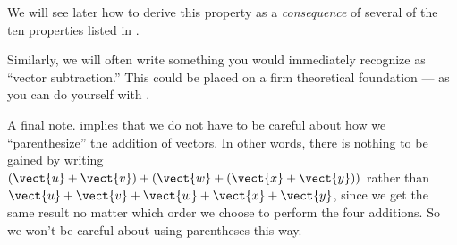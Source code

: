%
We will see later how to derive this property as a {\em consequence} of several of the ten properties listed in .\par
%
Similarly, we will often write something you would immediately recognize as ``vector subtraction.''  This could be placed on a firm theoretical foundation --- as you can do yourself with .\par
%
A final note.   implies that we do not have to be careful about how we ``parenthesize'' the addition of vectors.  In other words, there is nothing to be gained by writing
$\left(\vect{u}+\vect{v}\right)+\left(\vect{w}+\left(\vect{x}+\vect{y}\right)\right)$
rather than
$\vect{u}+\vect{v}+\vect{w}+\vect{x}+\vect{y}$, since we get the same result no matter which order we choose to perform the four additions.  So we won't be careful about using parentheses this way.
%

